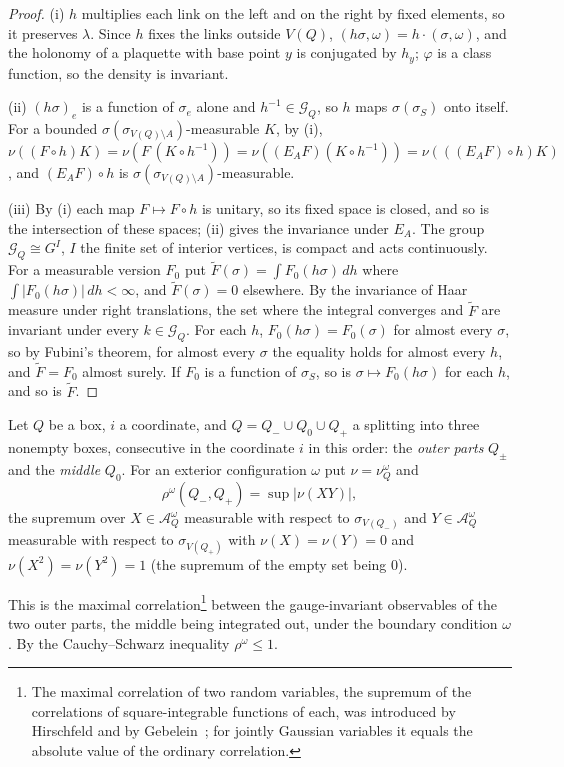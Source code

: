 \begin{proof}
(i) $h$ multiplies each link on the left and on the right by fixed elements,
so it preserves $\lambda$. Since $h$ fixes the links outside $V(Q)$,
$(h\sigma,\omega)=h\cdot(\sigma,\omega)$, and the holonomy of a plaquette
with base point $y$ is conjugated by $h_y$; $\varphi$ is a class function,
so the density is invariant.

(ii) $(h\sigma)_e$ is a function of $\sigma_e$ alone and $h^{-1}\in\mathcal
G_Q$, so $h$ maps $\sigma(\sigma_S)$ onto itself. For a bounded
$\sigma(\sigma_{V(Q)\setminus A})$-measurable $K$, by (i),
$\nu((F\circ h)K)=\nu(F\,(K\circ h^{-1}))=\nu((E_AF)(K\circ h^{-1}))=
\nu(((E_AF)\circ h)K)$, and $(E_AF)\circ h$ is
$\sigma(\sigma_{V(Q)\setminus A})$-measurable.

(iii) By (i) each map $F\mapsto F\circ h$ is unitary, so its fixed space is
closed, and so is the intersection of these spaces; (ii) gives the
invariance under $E_A$. The group $\mathcal G_Q\cong G^I$, $I$ the finite set
of interior vertices, is compact and acts continuously. For a measurable
version $F_0$ put $\tilde F(\sigma)=\int F_0(h\sigma)\,dh$ where
$\int|F_0(h\sigma)|\,dh<\infty$, and $\tilde F(\sigma)=0$ elsewhere. By the
invariance of Haar measure under right translations, the set where the
integral converges and $\tilde F$ are invariant under every $k\in\mathcal
G_Q$. For each $h$, $F_0(h\sigma)=F_0(\sigma)$ for almost every $\sigma$, so
by Fubini's theorem, for almost every $\sigma$ the equality holds for almost
every $h$, and $\tilde F=F_0$ almost surely. If $F_0$ is a function of
$\sigma_S$, so is $\sigma\mapsto F_0(h\sigma)$ for each $h$, and so is
$\tilde F$.
\end{proof}

\begin{definition}\label{def:rho}
Let $Q$ be a box, $i$ a coordinate, and $Q=Q_-\cup Q_0\cup Q_+$ a splitting
into three nonempty boxes, consecutive in the coordinate $i$ in this order:
the \emph{outer parts} $Q_\pm$ and the \emph{middle} $Q_0$. For an exterior
configuration $\omega$ put $\nu=\nu^\omega_Q$ and
\[
\rho^\omega(Q_-,Q_+)=\sup|\nu(XY)|,
\]
the supremum over $X\in\mathcal A^\omega_Q$ measurable with respect to
$\sigma_{V(Q_-)}$ and $Y\in\mathcal A^\omega_Q$ measurable with respect to
$\sigma_{V(Q_+)}$ with $\nu(X)=\nu(Y)=0$ and $\nu(X^2)=\nu(Y^2)=1$ (the
supremum of the empty set being $0$).
\end{definition}

This is the maximal correlation\footnote{The maximal correlation of two
random variables, the supremum of the correlations of square-integrable
functions of each, was introduced by Hirschfeld and by
Gebelein~\cite{Geb41}; for jointly Gaussian variables it equals the
absolute value of the ordinary correlation.} between the gauge-invariant
observables of the two outer parts, the middle being integrated out, under
the boundary condition $\omega$. By the Cauchy--Schwarz inequality
$\rho^\omega\le1$.

